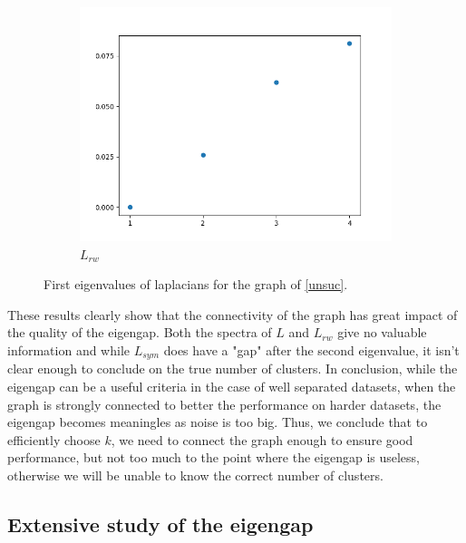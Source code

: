 \documentclass[a4paper,12pt]{article}
\theoremstyle{definition}
\theoremstyle{plain}
\begin{document}
\begin{figure}[H]
\begin{subfigure}{.3\textwidth}
		\includegraphics[width=1.1\linewidth]{figures/Fig_E6_L_rw}
		\caption{$L_{rw}$}
	\end{subfigure}
	\caption{First eigenvalues of laplacians for the graph of \ref{unsuc}.}
\end{figure}
These results clearly show that the connectivity of the graph has great impact of the quality of the eigengap. Both the spectra of $L$ and $L_{rw}$ give no valuable information and while $L_{sym}$ does have a "gap" after the second eigenvalue, it isn't clear enough to conclude on the true number of clusters.
In conclusion, while the eigengap can be a useful criteria in the case of well separated datasets, when the graph is strongly connected to better the performance on harder datasets, the eigengap becomes meaningles as noise is too big.
Thus, we conclude that to efficiently choose $k$, we need to connect the graph enough to ensure good performance, but not too much to the point where the eigengap is useless, otherwise we will be unable to know the correct number of clusters.
\subsection{Extensive study of the eigengap}
\end{document}

